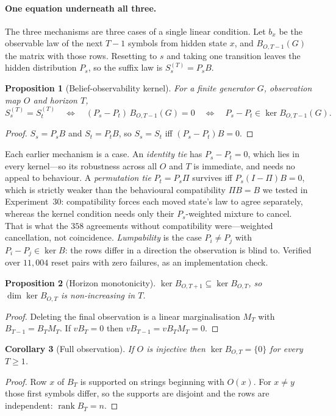 \documentclass[11pt]{article}
\newtheorem{proposition}{Proposition}
\newtheorem{corollary}[proposition]{Corollary}
\begin{document}
\paragraph{One equation underneath all three.}
The three mechanisms are three cases of a single linear condition. Let $b_x$ be the
observable law of the next $T-1$ symbols from hidden state $x$, and $B_{O,T-1}(G)$ the
matrix with those rows. Resetting to $s$ and taking one transition leaves the hidden
distribution $P_s$, so the suffix law is $S_s^{(T)} = P_s B$.

\begin{proposition}[Belief-observability kernel]\label{prop:kernel}
For a finite generator $G$, observation map $O$ and horizon $T$,
\[
  S_s^{(T)} = S_t^{(T)}
  \quad\Longleftrightarrow\quad
  (P_s - P_t)\,B_{O,T-1}(G) = 0
  \quad\Longleftrightarrow\quad
  P_s - P_t \in \ker B_{O,T-1}(G).
\]
\end{proposition}
\begin{proof}
$S_s = P_s B$ and $S_t = P_t B$, so $S_s = S_t$ iff $(P_s - P_t)B = 0$.
\end{proof}

Each earlier mechanism is a case. An \emph{identity tie} has $P_s - P_t = 0$, which lies
in every kernel---so its robustness across all $O$ and $T$ is immediate, and needs no
appeal to behaviour. A \emph{permutation tie} $P_t = P_s \Pi$ survives iff
$P_s(I - \Pi)B = 0$, which is strictly weaker than the behavioural compatibility
$\Pi B = B$ we tested in Experiment~30: compatibility forces each moved state's law to
agree separately, whereas the kernel condition needs only their $P_s$-weighted mixture to
cancel. That is what the $358$ agreements without compatibility were---weighted
cancellation, not coincidence. \emph{Lumpability} is the case $P_i \ne P_j$ with
$P_i - P_j \in \ker B$: the rows differ in a direction the observation is blind to.
Verified over $11{,}004$ reset pairs with zero failures, as an implementation check.

\begin{proposition}[Horizon monotonicity]\label{prop:mono}
$\ker B_{O,T+1} \subseteq \ker B_{O,T}$, so $\dim \ker B_{O,T}$ is non-increasing in $T$.
\end{proposition}
\begin{proof}
Deleting the final observation is a linear marginalisation $M_T$ with
$B_{T-1} = B_T M_T$. If $vB_T = 0$ then $vB_{T-1} = vB_T M_T = 0$.
\end{proof}

\begin{corollary}[Full observation]\label{cor:inj}
If $O$ is injective then $\ker B_{O,T} = \{0\}$ for every $T \ge 1$.
\end{corollary}
\begin{proof}
Row $x$ of $B_T$ is supported on strings beginning with $O(x)$. For $x \ne y$ those first
symbols differ, so the supports are disjoint and the rows are independent: $\operatorname{rank} B_T = n$.
\end{proof}
\end{document}
